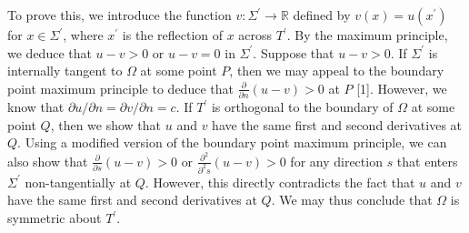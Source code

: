 \documentclass[20pt,,margin=1in,innermargin=-4.5in,blockverticalspace=-0.25in]{tikzposter}
\begin{document}
\begin{columns}
{    To prove this, we introduce the function $v: \Sigma^\prime \rightarrow \mathbb{R}$ defined by $v(x) = u(x^\prime)$ for $x \in \Sigma^\prime$, where $x^\prime$ is the reflection of $x$ across $T^\prime$. By the maximum principle, we deduce that $u - v > 0$ or $u-v = 0$ in $\Sigma^\prime$. Suppose that $u-v > 0$.  If $\Sigma^\prime$ is internally tangent to $\Omega$ at some point $P$, then we may appeal to the boundary point maximum principle to deduce that $\frac{\partial}{\partial{n}}(u-v) > 0$ at $P$ [1]. However, we know that $\partial{u}/\partial{n} = \partial{v}/\partial{n} = c$. If $T^\prime$ is orthogonal to the boundary of $\Omega$ at some point $Q$, then we show that $u$ and $v$ have the same first and second derivatives at $Q$. Using a modified version of the boundary point maximum principle, we can also show that $\frac{\partial}{\partial{s}} (u-v) > 0 \text{ or } \frac{\partial^2}{\partial^2{s}}(u-v) > 0$ for any direction $s$ that enters $\Sigma^\prime$ non-tangentially at $Q$. However, this directly contradicts the fact that $u$ and $v$ have the same first and second derivatives at $Q$. We may thus conclude that $\Omega$ is symmetric about $T^\prime$.
}



\end{columns}
\end{document}
